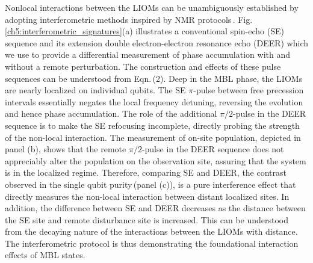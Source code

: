 Nonlocal interactions between the LIOMs can be unambiguously established by adopting interferometric methods inspired by NMR protocols\,\cite{KnapPRL2014}.  Fig.\,\ref{ch5:interferometric_signatures}(a) illustrates a conventional spin-echo (SE) sequence and its extension double electron-electron resonance echo (DEER) which we use to provide a differential measurement of phase accumulation with and without a remote perturbation. The construction and effects of these pulse sequences can be understood from Eqn.\,(2). Deep in the MBL phase, the LIOMs are nearly localized on individual qubits. The SE $\pi$-pulse between free precession intervals essentially negates the local frequency detuning, reversing the evolution and hence phase accumulation. The role of the additional $\pi/2$-pulse in the DEER sequence is to make the SE refocusing incomplete, directly probing the strength of the non-local interaction. The measurement of on-site population, depicted in panel (b), shows that the remote $\pi / 2$-pulse in the DEER sequence does not appreciably alter the population on the observation site, assuring that the system is in the localized regime. Therefore, comparing SE and DEER, the contrast observed in the single qubit purity\,(panel (c)), is a pure interference effect that directly measures the non-local interaction between distant localized sites. In addition, the difference between SE and DEER decreases as the distance between the SE site and remote disturbance site is increased. This can be understood from the decaying nature of the interactions between the LIOMs with distance. The interferometric protocol is thus demonstrating the foundational interaction effects of MBL states.

